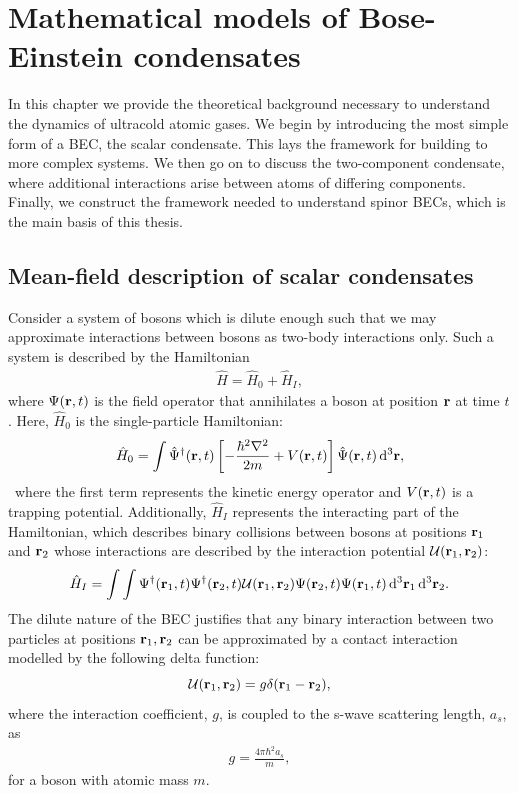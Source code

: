 \chapter{Mathematical models of Bose-Einstein condensates}\label{chap: theory}

In this chapter we provide the theoretical background necessary to understand
the dynamics of ultracold atomic gases.
We begin by introducing the most simple form of a BEC, the scalar condensate.
This lays the framework for building to more complex systems.
We then go on to discuss the two-component condensate, where additional
interactions arise between atoms of differing components.
Finally, we construct the framework needed to understand spinor BECs, which is
the main basis of this thesis.

\section{Mean-field description of scalar condensates}
Consider a system of bosons which is dilute enough such that we may approximate
interactions between bosons as two-body interactions only.
Such a system is described by the Hamiltonian~\cite{Pethick2008}
\begin{align}\label{eq: scalar-hamiltonian}
    \hat{H} = \hat{H}_0 + \hat{H}_I,
\end{align}
where \(\Psi(\vb{r}, t)\) is the field operator that annihilates a boson at
position \(\vb{r}\) at time \(t\).
Here, \(\hat{H}_0\) is the single-particle Hamiltonian:
\begin{align}
    \hat{H}_0 = \int \hat{\Psi}^\dagger(\vb{r}, t)\left[
        -\frac{\hbar^2\nabla^2}{2m} + V(\vb{r}, t)
    \right]\hat{\Psi}(\vb{r}, t)\, \dd^3\vb{r},
\end{align}\
where the first term represents the kinetic energy operator and \(V(\vb{r}, t)\)
is a trapping potential.
Additionally, \(\hat{H}_I\) represents the interacting part of the Hamiltonian,
which describes binary collisions between bosons at positions \(\vb{r}_1\) and
\(\vb{r}_2\) whose interactions are described by the interaction potential
\(\mathcal{U}(\vb{r}_1, \vb{r}_2)\):
\begin{align}
    \hat{H}_I = \int \int \Psi^\dagger(\vb{r}_1, t)\Psi^\dagger(\vb{r}_2, t)
    \mathcal{U}(\vb{r}_1, \vb{r}_2)\Psi(\vb{r}_2, t)\Psi(\vb{r}_1, t)
    \, \dd^3\vb{r}_1 \, \dd^3\vb{r}_2.
\end{align}
The dilute nature of the BEC justifies that any binary interaction
between two particles at positions \(\vb{r}_1, \vb{r}_2\) can be approximated by
a contact interaction modelled by the following delta function:
\begin{equation}
    \mathcal{U}(\vb{r}_1, \vb{r}_2) = g\delta(\vb{r}_1 - \vb{r}_2),
\end{equation}
where the interaction coefficient, \(g\), is coupled to the s-wave scattering
length, \(a_s\), as
\begin{align}
    g = \frac{4\pi\hbar^2a_s}{m},
\end{align}
for a boson with atomic mass \(m\).

